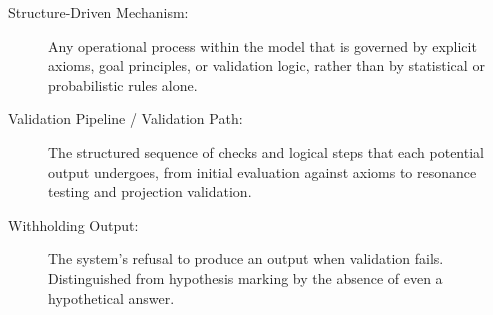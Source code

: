 \begin{description}
\item[Structure-Driven Mechanism:]  
Any operational process within the model that is governed by explicit axioms, goal principles, or validation logic, rather than by statistical or probabilistic rules alone.

\item[Validation Pipeline / Validation Path:]  
The structured sequence of checks and logical steps that each potential output undergoes, from initial evaluation against axioms to resonance testing and projection validation.

\item[Withholding Output:]  
The system’s refusal to produce an output when validation fails. Distinguished from hypothesis marking by the absence of even a hypothetical answer.

\end{description}
